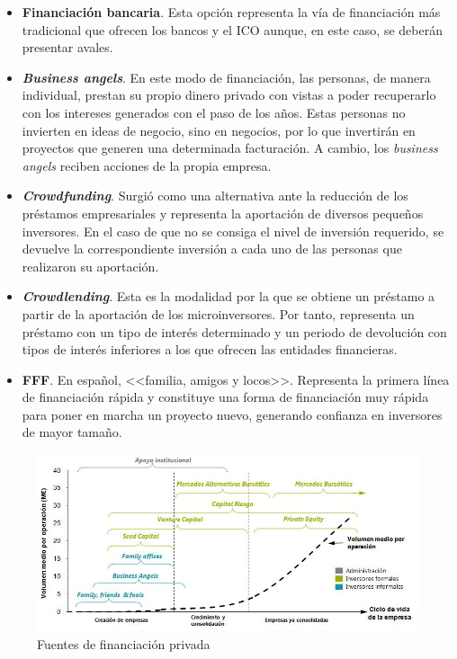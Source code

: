 \begin{itemize}
    \item \textbf{Financiación bancaria}. Esta opción representa la vía de financiación más tradicional que ofrecen los bancos y el \acf{ICO} aunque, en este caso, se deberán presentar avales.
    
    \item \textbf{\textit{Business angels}}. En este modo de financiación, las personas, de manera individual, prestan su propio dinero privado con vistas a poder recuperarlo con los intereses generados con el paso de los años. Estas personas no invierten en ideas de negocio, sino en negocios, por lo que invertirán en proyectos que generen una determinada facturación. A cambio, los \textit{business angels} reciben acciones de la propia empresa.
    
    \item \textbf{\textit{Crowdfunding}}. Surgió como una alternativa ante la reducción de los préstamos empresariales y representa la aportación de diversos pequeños inversores. En el caso de que no se consiga el nivel de inversión requerido, se devuelve la correspondiente inversión a cada uno de las personas que realizaron su aportación.
    
    \item \textbf{\textit{Crowdlending}}. Esta es la modalidad por la que se obtiene un préstamo a partir de la aportación de los microinversores. Por tanto, representa un préstamo con un tipo de interés determinado y un periodo de devolución con tipos de interés inferiores a los que ofrecen las entidades financieras.
    
    \item \textbf{\acf{FFF}}. En español, <<familia, amigos y locos>>. Representa la primera línea de financiación rápida y constituye una forma de financiación muy rápida para poner en marcha un proyecto nuevo, generando confianza en inversores de mayor tamaño.
    
\end{itemize}

\begin{figure}[h]
  \centering
  \includegraphics[width=0.8\linewidth]{figures/images/financiacion.png}
  \caption{Fuentes de financiación privada}
  \label{fig:financiacion}
\end{figure}

